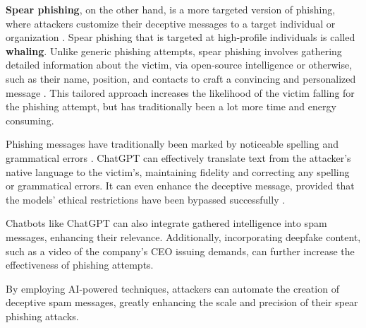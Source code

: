 
\textbf{Spear phishing}, on the other hand, is a more targeted version of phishing, where attackers customize their deceptive messages to a target individual or organization \citep{basitComprehensiveSurveyAIenabledPhishingAttacks2021, fakhouriAIDrivenSolutionsForSocialEngineeringAttacks2024}. Spear phishing that is targeted at high-profile individuals is called \textbf{whaling}. Unlike generic phishing attempts, spear phishing involves gathering detailed information about the victim, via open-source intelligence or otherwise, such as their name, position, and contacts to craft a convincing and personalized message \citep{salahdineSocialEngineeringAttacks2019}. This tailored approach increases the likelihood of the victim falling for the phishing attempt, but has traditionally been a lot more time and energy consuming.

Phishing messages have traditionally been marked by noticeable spelling and grammatical errors \citep{herleySoLongAndNoThanksForTheExternalities2009}. ChatGPT can effectively translate text from the attacker’s native language to the victim’s, maintaining fidelity and correcting any spelling or grammatical errors. It can even enhance the deceptive message, provided that the models' ethical restrictions have been bypassed successfully \citep{guptaFromChatGPTtoThreatGPT2023}.

Chatbots like ChatGPT can also integrate gathered intelligence into spam messages, enhancing their relevance. Additionally, incorporating deepfake content, such as a video of the company’s CEO issuing demands, can further increase the effectiveness of phishing attempts.

By employing AI-powered techniques, attackers can automate the creation of deceptive spam messages, greatly enhancing the scale and precision of their spear phishing attacks.



















